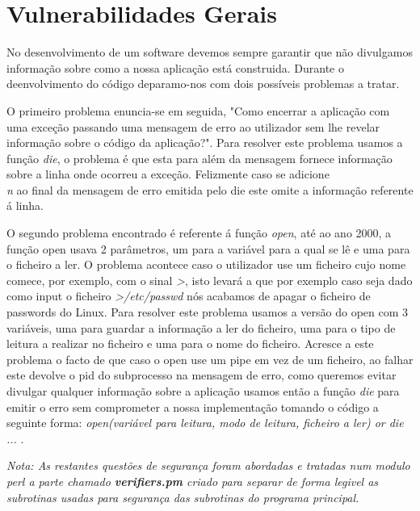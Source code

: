 \section{Vulnerabilidades Gerais}

No desenvolvimento de um software devemos sempre garantir que não divulgamos informação sobre como a nossa aplicação está construida. Durante o deenvolvimento do código deparamo-nos com dois possíveis problemas a tratar.\newline
\par O primeiro problema enuncia-se em seguida, "Como encerrar a aplicação com uma exceção passando uma mensagem de erro ao utilizador sem lhe revelar informação sobre o código da aplicação?". Para resolver este problema usamos a função \textit{die}, o problema é que esta para além da mensagem fornece informação sobre a linha onde ocorreu a exceção. Felizmente caso se adicione \textit{\\n} ao final da mensagem de erro emitida pelo die este omite a informação referente á linha. 
\par O segundo problema encontrado é referente á função \textit{open}, até ao ano 2000, a função open usava 2 parâmetros, um para a variável para a qual se lê e uma para o ficheiro a ler. O problema  acontece caso o utilizador use um ficheiro cujo nome comece, por exemplo, com o sinal \textit{>}, isto levará a que por exemplo caso seja dado como input o ficheiro \textit{>/etc/passwd} nós acabamos de apagar o ficheiro de passwords do Linux. Para resolver este problema usamos a versão do open com 3 variáveis, uma para guardar a informação a ler do ficheiro, uma para o tipo de leitura a realizar no ficheiro e uma para o nome do ficheiro. Acresce a este problema o facto de que caso o open use um pipe em vez de um ficheiro, ao falhar este devolve o pid do subprocesso na mensagem de erro, como queremos evitar divulgar qualquer informação sobre a aplicação usamos então a função \textit{die} para emitir o erro sem comprometer a nossa implementação tomando o código a seguinte forma: \textit{open(variável para leitura, modo de leitura, ficheiro a ler) or die ... }.\newline

\textit{Nota: As restantes questões de segurança foram abordadas e tratadas num modulo perl a parte chamado \textbf{verifiers.pm} criado para separar de forma legivel as subrotinas usadas para segurança das subrotinas do programa principal.}\newline 

